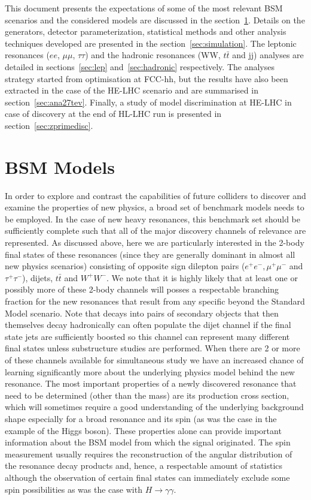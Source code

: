 \documentclass[a4paper,11pt]{article}
\begin{document}
This document presents the expectations of some of the most relevant BSM scenarios and the considered models are discussed in the section~\ref{sec:bsmmodels}.
Details on the generators, detector parameterization, statistical methods and other analysis techniques developed are presented in the section~\ref{sec:simulation}.
The leptonic resonances ($ee$, $\mu\mu$, $\tau\tau$) and the hadronic resonances (WW, $t\bar{t}$ and jj) analyses are detailed in sections~\ref{sec:lep} and~\ref{sec:hadronic} respectively.
The analyses strategy started from optimisation at FCC-hh, but the results have also been extracted in the case of the HE-LHC scenario and are summarised in section~\ref{sec:ana27tev}.
Finally, a study of model discrimination at HE-LHC in case of discovery at the end of HL-LHC run is presented in section~\ref{sec:zprimedisc}.

\section{BSM Models}
\label{sec:bsmmodels}

In order to explore and contrast the capabilities of future colliders to discover and examine the properties of new physics, a broad set of benchmark models needs to be employed. In the
case of new heavy resonances, this benchmark set should be sufficiently complete such that all of the major discovery channels of relevance are represented. As discussed above, here we
are particularly interested in the 2-body final states of these resonances (since they are generally dominant in almost all new physics scenarios) consisting of opposite sign dilepton
pairs ($e^+e^-, \mu^+\mu^-$ and $\tau^+\tau^-$), dijets, $ t\bar t$ and $W^+W^-$.  We note that it is highly likely that at least one or possibly more of these 2-body channels will posses
a respectable branching fraction for the new resonances that result from any specific beyond the Standard Model scenario. Note that decays into pairs of secondary objects that
then themselves decay hadronically can often populate the dijet channel if the final state jets are sufficiently boosted so this channel can represent many different final states unless
substructure studies are performed.  When there are 2 or more of these channels available for simultaneous study we have an increased chance of learning significantly more about
the underlying physics model behind the new resonance. The most important properties of a newly discovered resonance that need to be determined (other than the mass) are its
production cross section, which will sometimes require a good understanding of the underlying background shape especially for a broad resonance and its spin (as was the case in
the example of the Higgs boson). These properties alone can provide important information about the BSM model from which the signal originated. The spin measurement usually requires
the reconstruction of the angular distribution of the resonance decay products and, hence, a respectable amount of statistics although the observation of certain final states can
immediately exclude some spin possibilities as was the case with $H\rightarrow \gamma \gamma$.
\end{document}
